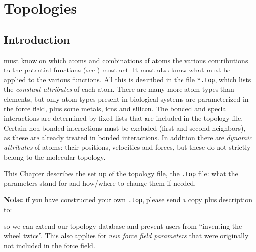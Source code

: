 %
% 
% 
% 
% 
% 
% 
% 
% 
%

\chapter{Topologies}
\label{ch:top}
\section{Introduction}
{\gromacs} must know on which atoms and combinations of atoms the
various contributions to the potential functions (see
) must act. It must
also know what  must be applied to the various
functions. All this is described in the {\em {}} file
\verb'*.top', which lists the {\em constant attributes} of each atom.
There are many more atom types than elements, but only atom types
present in biological systems are parameterized in the force field,
plus some metals, ions and silicon. The bonded and special
interactions are determined by fixed lists that are included in the
topology file. Certain non-bonded interactions must be excluded (first
and second neighbors), as these are already treated in bonded
interactions.  In addition there are {\em dynamic attributes} of
atoms: their positions, velocities and forces, but these do not
strictly belong to the molecular topology.

This Chapter describes the set up of the topology file, the
{\tt *.top} file: what the parameters stand for and how/where to
change them if needed.

{\bf Note:} if you have constructed your own {\tt *.top}, please
send a copy plus description to:
\centerline{\email}

so we can extend our topology database and prevent {\gromacs} users
from ``inventing the wheel twice''. This also applies for {\em new
force field parameters} that were originally not included in the
{\gromacs} force field.


